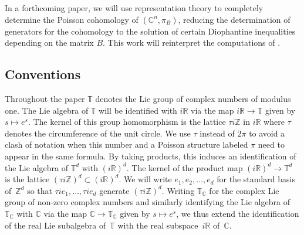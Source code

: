 \documentclass[pdftex]{sigma}
\numberwithin{equation}{section}
\begin{document}
In a forthcoming paper, we will use representation theory to completely determine the Poisson cohomology of $({\mathbb C}^n,\pi_B)$, reducing the determination of generators for the cohomology to the solution of certain Diophantine inequalities depending on the matrix $B$. This work will reinterpret the computations of \cite{Monnier}.

\subsection*{Conventions}

Throughout the paper ${\mathbb T}$ denotes the Lie group of complex numbers of modulus one. The Lie algebra of ${\mathbb T}$ will be identif\/ied with $i{\mathbb R}$ via the map $i{\mathbb R}\to{\mathbb T}$ given by $s\mapsto e^s$. The kernel of this group homomorphism is the lattice $\tau i{\mathbb Z}$ in $i{\mathbb R}$ where $\tau$ denotes the circumference of the unit circle. We use $\tau$ instead of $2\pi$ to avoid a clash of notation when this number and a Poisson structure labeled $\pi$ need to appear in the same formula. By taking products, this induces an identif\/ication of the Lie algebra of ${\mathbb T}^d$ with $(i{\mathbb R})^d$. The kernel of the product map $(i{\mathbb R})^d\to {\mathbb T}^d$ is the lattice $(\tau i{\mathbb Z})^d\subset(i{\mathbb R})^d$. We will write $e_1,e_2,\dots,e_d$ for the standard basis of~${\mathbb Z}^d$ so that $\tau i e_1,\dots,\tau ie_d$ generate $(\tau i{\mathbb Z})^d$. Writing ${\mathbb T}_{\mathbb C}$ for the complex Lie group of non-zero complex numbers and similarly identifying the Lie algebra of ${\mathbb T}_{\mathbb C}$ with ${\mathbb C}$ via the map ${\mathbb C}\to {\mathbb T}_{\mathbb C}$ given by $s\mapsto e^s$, we thus extend the identif\/ication of the real Lie subalgebra of~${\mathbb T}$ with the real subspace~$i{\mathbb R}$ of~${\mathbb C}$.
\end{document}
